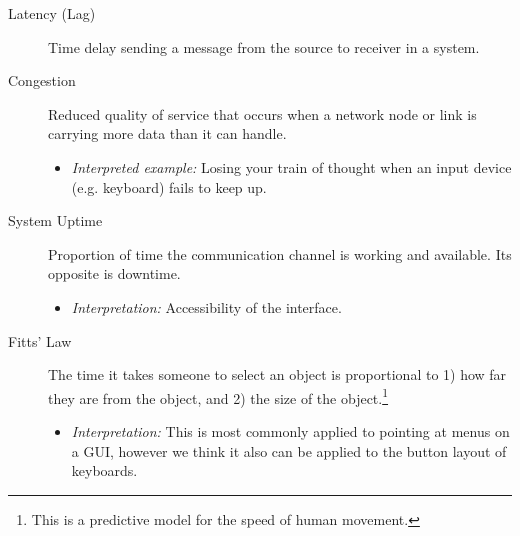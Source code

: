 \documentclass[logo,bsc,singlespacing,parskip]{infthesis}
\begin{document}
{\begin{mdframed}
\begin{description}
\item[{Latency (Lag)}] Time delay sending a message from the source to receiver in a system.
\end{description}
\end{mdframed}

\begin{mdframed}
\begin{description}
\item[{\label{org8994918}Congestion}] Reduced quality of service that occurs when a network node or link is carrying more data than it can handle.
\begin{itemize}
\item \emph{Interpreted example:} Losing your train of thought when an input device (e.g. keyboard) fails to keep up.
\end{itemize}
\end{description}
\end{mdframed}

\begin{mdframed}
\begin{description}
\item[{\label{org187665d}System Uptime}] Proportion of time the communication channel is working and available. Its opposite is downtime.
\begin{itemize}
\item \emph{Interpretation:} Accessibility of the interface.
\end{itemize}
\end{description}
\end{mdframed}

\begin{mdframed}
\begin{description}
\item[{Fitts' Law}] The time it takes someone to select an object is proportional to 1) how far they are from the object, and 2) the size of the object.\footnote{This is a predictive model for the speed of human movement.}
\begin{itemize}
\item \emph{Interpretation:} This is most commonly applied to pointing at menus on a GUI, however we think it also can be applied to the button layout of keyboards.
\end{itemize}
\end{description}
\end{mdframed}

}
\end{document}
